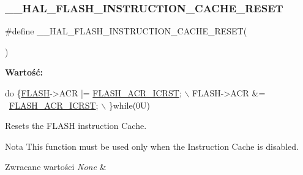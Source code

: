\mbox{\label{group___f_l_a_s_h___exported___macros_ga69dff538775ee23738d54eef4a259b66}} 
\subsubsection{\texorpdfstring{\+\_\+\+\_\+\+H\+A\+L\+\_\+\+F\+L\+A\+S\+H\+\_\+\+I\+N\+S\+T\+R\+U\+C\+T\+I\+O\+N\+\_\+\+C\+A\+C\+H\+E\+\_\+\+R\+E\+S\+ET}{\_\_HAL\_FLASH\_INSTRUCTION\_CACHE\_RESET}}
{\footnotesize\ttfamily \#define \+\_\+\+\_\+\+H\+A\+L\+\_\+\+F\+L\+A\+S\+H\+\_\+\+I\+N\+S\+T\+R\+U\+C\+T\+I\+O\+N\+\_\+\+C\+A\+C\+H\+E\+\_\+\+R\+E\+S\+ET(\begin{DoxyParamCaption}{ }\end{DoxyParamCaption})}

{\bfseries Wartość\+:}
\begin{DoxyCode}
\textcolor{keywordflow}{do} \{\hyperlink{group___peripheral__declaration_ga844ea28ba1e0a5a0e497f16b61ea306b}{FLASH}->ACR |= \hyperlink{group___peripheral___registers___bits___definition_ga923ff88475799eea9285f77f5383ced5}{FLASH\_ACR\_ICRST};  \(\backslash\)
                                                  FLASH->ACR &= ~\hyperlink{group___peripheral___registers___bits___definition_ga923ff88475799eea9285f77f5383ced5}{FLASH\_ACR\_ICRST}; \(\backslash\)
                                                 \}\textcolor{keywordflow}{while}(0U)
\end{DoxyCode}


Resets the F\+L\+A\+SH instruction Cache. 

\begin{DoxyNote}{Nota}
This function must be used only when the Instruction Cache is disabled. 
\end{DoxyNote}

\begin{DoxyRetVals}{Zwracane wartości}
{\em None} & \\
\hline
\end{DoxyRetVals}


